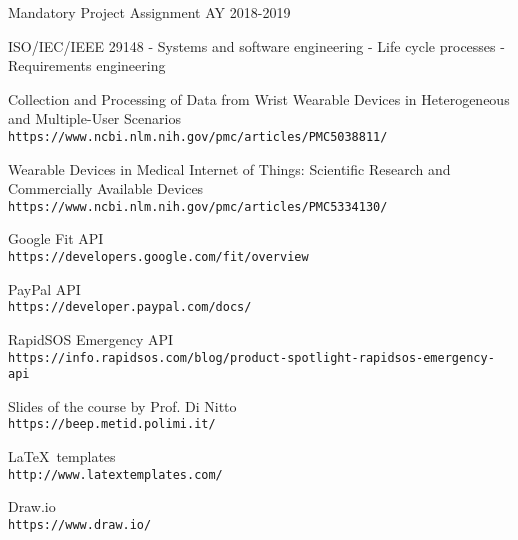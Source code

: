 \documentclass[../DD0.tex]{subfiles}
\begin{document}
\begin{thebibliography}{9}
   Mandatory Project Assignment AY 2018-2019


   ISO/IEC/IEEE 29148 - Systems and software engineering - Life cycle processes - Requirements engineering

   Collection and Processing of Data from Wrist Wearable Devices in Heterogeneous and Multiple-User Scenarios\\
  \texttt{https://www.ncbi.nlm.nih.gov/pmc/articles/PMC5038811/}

   Wearable Devices in Medical Internet of Things: Scientific Research and Commercially Available Devices\\
  \texttt{https://www.ncbi.nlm.nih.gov/pmc/articles/PMC5334130/}


   Google Fit API\\
  \texttt{https://developers.google.com/fit/overview}

   PayPal API\\
  \texttt{https://developer.paypal.com/docs/}

   RapidSOS Emergency API\\
  \texttt{https://info.rapidsos.com/blog/product-spotlight-rapidsos-emergency-api}

  Slides of the course by Prof. Di Nitto\\
  \texttt{https://beep.metid.polimi.it/}

  \LaTeX\ templates\\
  \texttt{http://www.latextemplates.com/}

  Draw.io\\
  \texttt{https://www.draw.io/}
\end{thebibliography}
\end{document}

